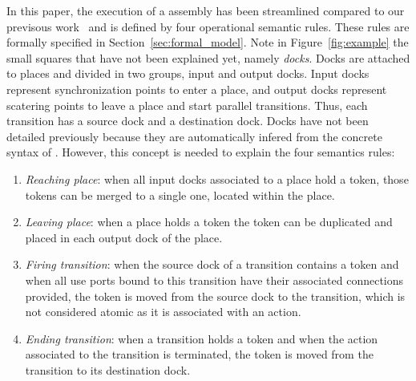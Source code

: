 In this paper, the execution of a \mad assembly has been streamlined
compared to our previsous work~\cite{chardet:hal-01858150} and is
defined by four operational semantic rules. These rules are formally
specified in Section~\ref{sec:formal_model}. Note in
Figure~\ref{fig:example} the small squares that have not been
explained yet, namely \emph{docks}. Docks are attached to places and
divided in two groups, input and output docks. Input docks represent
synchronization points to enter a place, and output docks represent
scatering points to leave a place and start parallel
transitions. Thus, each transition has a source dock and a destination
dock. Docks have not been detailed previously because they are
automatically infered from the concrete syntax of \mad. However, this
concept is needed to explain the four semantics rules:
%
\begin{enumerate}
\item \emph{Reaching place}: when all input docks associated to a
  place hold a token, those tokens can be merged to a single one,
  located within the place.
\item \emph{Leaving place}: when a place holds a token the token can
  be duplicated and placed in each output dock of the place.
\item \emph{Firing transition}: when the source dock of a transition
  contains a token and when all use ports bound to this transition
  have their associated connections provided, the token is moved from
  the source dock to the transition, which is not considered atomic as
  it is associated with an action.
\item \emph{Ending transition}: when a transition holds a token and
  when the action associated to the transition is terminated, the
  token is moved from the transition to its destination dock.
\end{enumerate}

